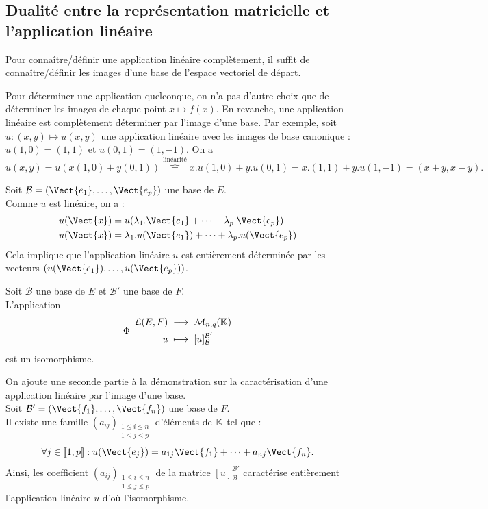 \documentclass{book}
\begin{document}
 \subsection{Dualité entre la représentation matricielle et l'application linéaire}
\begin{Theoreme}
Pour connaître/définir une application linéaire complètement, il suffit de connaître/définir les  images d'une base de l'espace vectoriel de départ. 
\end{Theoreme}
\begin{Remarque}
Pour déterminer une application quelconque, on n'a pas d'autre choix que de déterminer les images de chaque point $x\mapsto f(x)$. En revanche,   une application linéaire est complètement déterminer par l'image d'une base. Par exemple, soit $u:(x,y)\mapsto u(x,y)$ une application linéaire avec les images de base canonique : $u(1,0)=(1,1)$ et $u(0,1)=(1,-1)$. On a 
$$u(x,y)=u(x(1,0)+y(0,1))\overbrace{=}^{\text{linéarité}}x.u(1,0)+ y.u(0,1)=x.(1,1)+ y.u(1,-1)=(x+y,x-y).$$    
\end{Remarque}
\begin{Demonstration}
Soit $\mathcal{B}=(\Vect{e_1},\dots,\Vect{e_p})$ une base de $E$.\\
Comme $u$ est linéaire, on a :
\begin{align}
u(\Vect{x})&=u(\lambda_1.\Vect{e_1}+\dots +\lambda_p.\Vect{e_p})\\
u(\Vect{x})&=\lambda_1.u(\Vect{e_1})+\dots +\lambda_p.u(\Vect{e_p})
\end{align}
Cela implique que l'application linéaire $u$ est entièrement déterminée par les vecteurs $(u(\Vect{e_1}),\dots,u(\Vect{e_p}))$.
\end{Demonstration}
\begin{Theoreme}[Dualité]
Soit $\mathcal{B}$ une base de $E$ et $\mathcal{B}'$ une base de $F$.\\
L'application
\[ {\Phi}\left|\begin{aligned}{\mathcal{L}(E,F)}&\;\longrightarrow\;{\mathcal{M}_{n,q}(\mathbb{K}) }\\{u}&\;\longmapsto\;{[u]_\mathcal{B}^{\mathcal{B}'}}\end{aligned}\right. \]
est  un isomorphisme.
\end{Theoreme}
\begin{Demonstration}
On ajoute une seconde partie à la démonstration sur la caractérisation d'une application linéaire par l'image d'une base.\\
Soit $\mathcal{B}'=(\Vect{f_1},\dots,\Vect{f_n})$ une base de $F$.\\
Il existe une famille $(a_{ij})_{\substack{1\leq i\leq n\\1\leq j\leq p}}$ d'éléments de $\mathbb{K}$ tel que :
$$\forall j\in \Intf{1}{p}: u(\Vect{e_j})=a_{1j}\Vect{f_1}+\dots+a_{nj}\Vect{f_n}.$$ 
Ainsi, les coefficient $(a_{ij})_{\substack{1\leq i\leq n\\1\leq j\leq p}}$ de la matrice $[u]_\mathcal{B}^{\mathcal{B}'}$   caractérise entièrement l'application linéaire $u$ d'où l'isomorphisme. 
\end{Demonstration}
\end{document}
